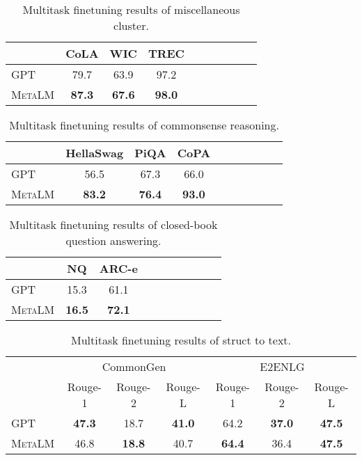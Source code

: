 \documentclass{article}
\theoremstyle{plain}
\theoremstyle{definition}
\theoremstyle{remark}
\newcommand\ours{\textsc{MetaLM}}
\begin{document}
\begin{table}[tp!]
\centering
\begin{tabular}{l c c c c c c c c c}
\toprule
 & CoLA & WIC & TREC \\
\midrule
GPT & 79.7 & 63.9 & 97.2 \\
\ours{} & \textbf{87.3}& \textbf{67.6}& \textbf{98.0} \\
\bottomrule
\end{tabular}
\caption{Multitask finetuning results of miscellaneous cluster.}
\label{tbl:multi:misc}
\end{table}

\begin{table}[tp!]
\centering
\begin{tabular}{l c c c c c c c c c}
\toprule
 & HellaSwag & PiQA & CoPA \\
\midrule
GPT & 56.5 & 67.3 & 66.0 \\
\ours{} & \textbf{83.2}& \textbf{76.4}& \textbf{93.0} \\
\bottomrule
\end{tabular}
\caption{Multitask finetuning results of commonsense reasoning.}
\label{tbl:multi:common}
\end{table}

\begin{table}[tp!]
\centering
\begin{tabular}{l c c c c c c c c c}
\toprule
 & NQ & ARC-e \\
\midrule
GPT & 15.3 & 61.1 \\
\ours{} & \textbf{16.5}& \textbf{72.1} \\
\bottomrule
\end{tabular}
\caption{Multitask finetuning results of closed-book question answering.}
\label{tbl:multi:struct}
\end{table}

\begin{table}[tp!]
\centering
\begin{tabular}{l c c c c c c}
\toprule
 & \multicolumn{3}{c}{CommonGen} & \multicolumn{3}{c}{E2ENLG} \\
 \cmidrule(r){2-4} \cmidrule(l){5-7}
 & {Rouge-1} & {Rouge-2} & {Rouge-L} & {Rouge-1} & {Rouge-2} & {Rouge-L} \\
 \midrule
GPT & \textbf{47.3} & 18.7 & \textbf{41.0} & 64.2 & \textbf{37.0} & \textbf{47.5} \\
\ours{} & 46.8& \textbf{18.8}& 40.7& \textbf{64.4}& 36.4& \textbf{47.5} \\
\bottomrule
\end{tabular}
\caption{Multitask finetuning results of struct to text.}
\label{tbl:multi:closeqa}
\end{table}
\end{document}
